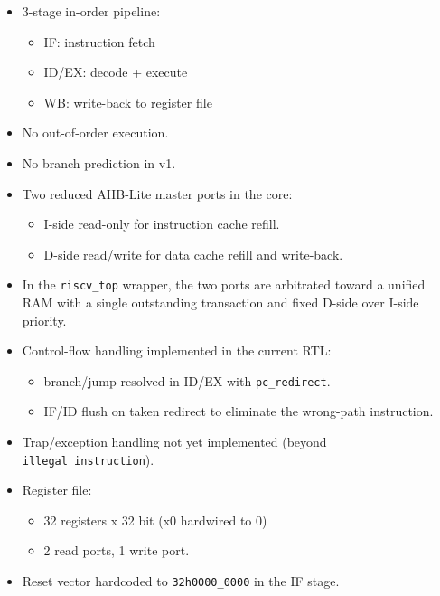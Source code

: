 \documentclass[]{article}
\providecommand{\tightlist}{%
  \setlength{\itemsep}{0pt}\setlength{\parskip}{0pt}}
\begin{document}
\begin{itemize}
\tightlist
\item
  3-stage in-order pipeline:

  \begin{itemize}
  \tightlist
  \item
    IF: instruction fetch
  \item
    ID/EX: decode + execute
  \item
    WB: write-back to register file
  \end{itemize}
\item
  No out-of-order execution.
\item
  No branch prediction in v1.
\item
  Two reduced AHB-Lite master ports in the core:

  \begin{itemize}
  \tightlist
  \item
    I-side read-only for instruction cache refill.
  \item
    D-side read/write for data cache refill and write-back.
  \end{itemize}
\item
  In the \texttt{riscv\_top} wrapper, the two ports are arbitrated
  toward a unified RAM with a single outstanding transaction and fixed
  D-side over I-side priority.
\item
  Control-flow handling implemented in the current RTL:

  \begin{itemize}
  \tightlist
  \item
    branch/jump resolved in ID/EX with \texttt{pc\_redirect}.
  \item
    IF/ID flush on taken redirect to eliminate the wrong-path
    instruction.
  \end{itemize}
\item
  Trap/exception handling not yet implemented (beyond
  \texttt{illegal\ instruction}).
\item
  Register file:

  \begin{itemize}
  \tightlist
  \item
    32 registers x 32 bit (x0 hardwired to 0)
  \item
    2 read ports, 1 write port.
  \end{itemize}
\item
  Reset vector hardcoded to \texttt{32\textquotesingle{}h0000\_0000} in
  the IF stage.
\end{itemize}
\end{document}
